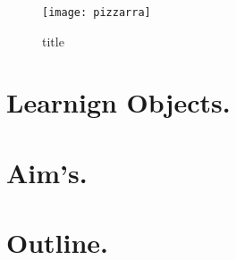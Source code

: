 \begin{figure}[h!]  
\centering  
\texttt{[image: pizzarra]}
\quad  
\caption{title}  
\label{name}  
\end{figure}




  
 

\section{Learnign Objects.}

\section{Aim's.}
\section{Outline.}